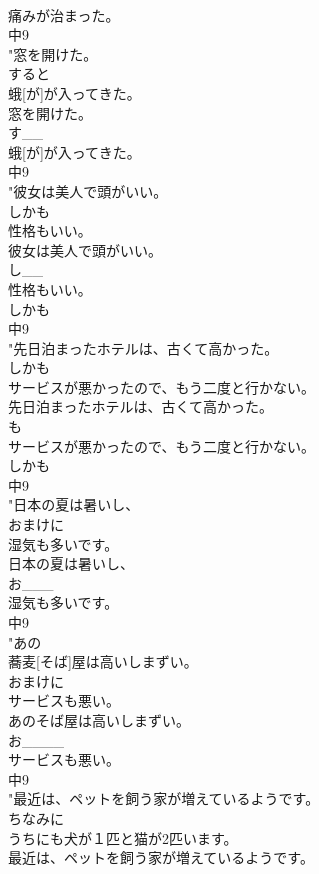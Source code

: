 \documentclass[8pt]{extreport}
\begin{document}
\begin{CJK}{UTF8}{min}
\\	痛みが治まった。
\\	中9
\\	"窓を開けた。
\\	すると
\\	蛾[が]が入ってきた。
\\	窓を開けた。
\\	す__
\\	蛾[が]が入ってきた。
\\	中9
\\	"彼女は美人で頭がいい。
\\	しかも
\\	性格もいい。
\\	彼女は美人で頭がいい。
\\	し__
\\	性格もいい。
\\	しかも
\\	中9
\\	"先日泊まったホテルは、古くて高かった。
\\	しかも
\\	サービスが悪かったので、もう二度と行かない。
\\	先日泊まったホテルは、古くて高かった。
\\	も
\\	サービスが悪かったので、もう二度と行かない。
\\	しかも
\\	中9
\\	"日本の夏は暑いし、
\\	おまけに
\\	湿気も多いです。
\\	日本の夏は暑いし、
\\	お___
\\	湿気も多いです。
\\	中9
\\	"あの
\\	蕎麦[そば]屋は高いしまずい。
\\	おまけに
\\	サービスも悪い。
\\	あのそば屋は高いしまずい。
\\	お____
\\	サービスも悪い。
\\	中9
\\	"最近は、ペットを飼う家が増えているようです。
\\	ちなみに
\\	うちにも犬が１匹と猫が2匹います。
\\	最近は、ペットを飼う家が増えているようです。

\end{CJK}
\end{document}
